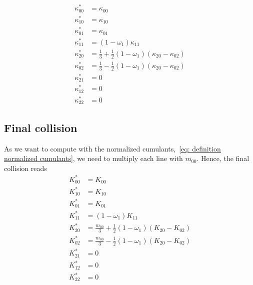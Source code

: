 \begin{equation}
  \begin{aligned}
    \kappa_{00}^{*} & = \kappa_{00} \\
    \kappa_{10}^{*} & = \kappa_{10} \\
    \kappa_{01}^{*} & = \kappa_{01} \\
    \kappa_{11}^{*} & = (1-\omega_1)\kappa_{11} \\
    \kappa_{20}^{*} & = \frac{1}{3} + \frac{1}{2}(1-\omega_1) (\kappa_{20} - \kappa_{02}) \\
    \kappa_{02}^{*} & = \frac{1}{3} - \frac{1}{2}(1-\omega_1) (\kappa_{20} - \kappa_{02}) \\
    \kappa_{21}^{*} & = 0 \\
    \kappa_{12}^{*} & = 0 \\
    \kappa_{22}^{*} & = 0
  \end{aligned}
\end{equation}

\subsection{Final collision}
\label{sub:Final collision}
As we want to compute with the normalized cumulants,~\eqref{eq: definition normalized cumulants}, we need to multiply each line with $m_{00}$. Hence, the final collision reads
\begin{equation}
  \begin{aligned}
    K_{00}^{*} & = K_{00} \\
    K_{10}^{*} & = K_{10} \\
    K_{01}^{*} & = K_{01} \\
    K_{11}^{*} & = (1-\omega_1)K_{11} \\
    K_{20}^{*} & = \frac{m_{00}}{3} + \frac{1}{2}(1-\omega_1) (K_{20} - K_{02}) \\
    K_{02}^{*} & = \frac{m_{00}}{3} - \frac{1}{2}(1-\omega_1) (K_{20} - K_{02}) \\
    K_{21}^{*} & = 0 \\
    K_{12}^{*} & = 0 \\
    K_{22}^{*} & = 0
  \end{aligned}
\end{equation}
